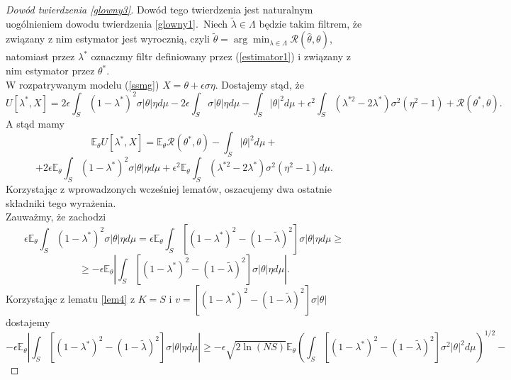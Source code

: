 \documentclass{article}
\begin{document}
\begin{proof}[Dowód twierdzenia \ref{glowny3}]
Dowód tego twierdzenia jest naturalnym uogólnieniem dowodu twierdzenia \ref{glowny1}.\
Niech $\tilde{\lambda}\in \Lambda$ będzie takim filtrem, że związany z nim estymator jest wyrocznią, czyli $\tilde{\theta}=\arg \min_{\lambda\in \Lambda}\mathcal{R}(\hat{\theta},\theta)$, natomiast przez $\lambda^*$ oznaczmy filtr definiowany przez (\ref{estimator1}) i związany z nim estymator przez $\theta^*$.\\
W rozpatrywanym modelu (\ref{ssmg}) $X=\theta+\epsilon\sigma\eta$. Dostajemy stąd, że 
\begin{displaymath}
U[\lambda^*,X]=2\epsilon\int_S(1-\lambda^*)^2\sigma |\theta|\eta d\mu-2\epsilon\int_S\sigma |\theta |\eta d\mu-\int_S|\theta |^2d\mu+\epsilon^2\int_S(\lambda^{*2}-2\lambda^*)\sigma^2(\eta^2-1)+\mathcal{R}(\theta^*,\theta).
\end{displaymath}
A stąd mamy
\begin{displaymath}
\mathbb{E}_{\theta}U[\lambda^*,X]=\mathbb{E}_{\theta}\mathcal{R}(\theta^*,\theta)-\int_S|\theta |^2d\mu+
\end{displaymath}
\begin{displaymath}
+2\epsilon\mathbb{E}_{\theta}\int_S(1-\lambda^*)^2\sigma |\theta |\eta d\mu+\epsilon^2\mathbb{E}_{\theta}\int_S(\lambda^{*2}-2\lambda^*)\sigma^2(\eta^2-1)d\mu.
\end{displaymath}
Korzystając z wprowadzonych wcześniej lematów, oszacujemy dwa ostatnie składniki tego wyrażenia.\\
Zauważmy, że zachodzi
\begin{displaymath}
\epsilon\mathbb{E}_{\theta}\int_S(1-\lambda^*)^2\sigma |\theta |\eta d\mu=
\epsilon\mathbb{E}_{\theta}\int_S[(1-\lambda^*)^2-(1-\tilde{\lambda})^2]\sigma |\theta |\eta d\mu\geq
\end{displaymath}
\begin{displaymath}
\geq -\epsilon\mathbb{E}_{\theta}\left|\int_S[(1-\lambda^*)^2-(1-\tilde{\lambda})^2]\sigma |\theta |\eta d\mu\right|.
\end{displaymath}
Korzystając z lematu \ref{lem4} z $K=S$ i $v=[(1-\lambda^*)^2-(1-\tilde{\lambda})^2]\sigma |\theta |$ dostajemy
\begin{displaymath}
-\epsilon\mathbb{E}_{\theta}\left|\int_S[(1-\lambda^*)^2-(1-\tilde{\lambda})^2]\sigma |\theta |\eta d\mu\right|\geq -\epsilon\sqrt{2\ln (NS)}\mathbb{E}_{\theta}\left(\int_S[(1-\lambda^*)^2-(1-\tilde{\lambda})^2]\sigma^2|\theta |^2 d\mu\right)^{1/2}-
\end{displaymath}

\end{proof}
\end{document}
